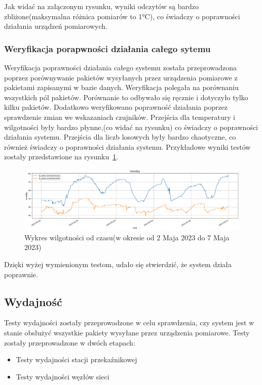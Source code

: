 Jak widać na załączonym rysunku, wyniki odczytów są bardzo zbliżone(maksymalna różnica pomiarów to 1°C), co świadczy o poprawności działania urządzeń pomiarowych.

\subsubsection{Weryfikacja porapwności działania całego sytemu}
Weryfikacja poprawności działania całego systemu została przeprowadzona poprzez porównywanie pakietów wysyłanych przez urządzenia pomiarowe z pakietami zapisanymi w bazie danych. Weryfikacja polegała na porównaniu wszystkich pól pakietów. Porównanie to odbywało się ręcznie i dotyczyło tylko kilku pakietów. Dodatkowo weryfikowano poprawność działania poprzez sprawdzenie zmian we wskazaniach czujników. Przejścia dla temperatury i wilgotności były bardzo płynne,(co widać na rysunku) co świadczy o poprawności działania systemu. Przejścia dla liczb losowych były bardzo chaotyczne, co również świadczy o poprawności działania systemu. Przykładowe wyniki testów zostały przedstawione na rysunku~\ref{rys:porownanie-hum}.

\begin{figure}[b!]
    \begin{center}
        \includegraphics[width=15cm]{pic/diagram-humidity.png}
    \end{center}
    \caption{Wykres wilgotności od czasu(w okresie od 2 Maja 2023 do 7 Maja 2023)}\label{rys:porownanie-hum}
\end{figure}


Dzięki wyżej wymienionym testom, udało się stwierdzić, że system działa poprawnie.

\subsection{Wydajność}
Testy wydajności zostały przeprowadzone w celu sprawdzenia, czy system jest w stanie obsłużyć wszystkie pakiety wysyłane przez urządzenia pomiarowe. Testy zostały przeprowadzone w dwóch etapach:
\begin{itemize}
    \item Testy wydajności stacji przekaźnikowej
    \item Testy wydajności węzłów sieci
\end{itemize}

